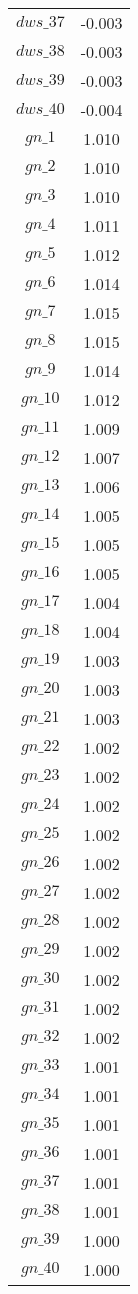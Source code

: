 \begin{center}
\begin{longtable}{cc}
$dws\_37$ 	 & 	 -0.003 \\
$dws\_38$ 	 & 	 -0.003 \\
$dws\_39$ 	 & 	 -0.003 \\
$dws\_40$ 	 & 	 -0.004 \\
$gn\_1$ 	 & 	 1.010 \\
$gn\_2$ 	 & 	 1.010 \\
$gn\_3$ 	 & 	 1.010 \\
$gn\_4$ 	 & 	 1.011 \\
$gn\_5$ 	 & 	 1.012 \\
$gn\_6$ 	 & 	 1.014 \\
$gn\_7$ 	 & 	 1.015 \\
$gn\_8$ 	 & 	 1.015 \\
$gn\_9$ 	 & 	 1.014 \\
$gn\_10$ 	 & 	 1.012 \\
$gn\_11$ 	 & 	 1.009 \\
$gn\_12$ 	 & 	 1.007 \\
$gn\_13$ 	 & 	 1.006 \\
$gn\_14$ 	 & 	 1.005 \\
$gn\_15$ 	 & 	 1.005 \\
$gn\_16$ 	 & 	 1.005 \\
$gn\_17$ 	 & 	 1.004 \\
$gn\_18$ 	 & 	 1.004 \\
$gn\_19$ 	 & 	 1.003 \\
$gn\_20$ 	 & 	 1.003 \\
$gn\_21$ 	 & 	 1.003 \\
$gn\_22$ 	 & 	 1.002 \\
$gn\_23$ 	 & 	 1.002 \\
$gn\_24$ 	 & 	 1.002 \\
$gn\_25$ 	 & 	 1.002 \\
$gn\_26$ 	 & 	 1.002 \\
$gn\_27$ 	 & 	 1.002 \\
$gn\_28$ 	 & 	 1.002 \\
$gn\_29$ 	 & 	 1.002 \\
$gn\_30$ 	 & 	 1.002 \\
$gn\_31$ 	 & 	 1.002 \\
$gn\_32$ 	 & 	 1.002 \\
$gn\_33$ 	 & 	 1.001 \\
$gn\_34$ 	 & 	 1.001 \\
$gn\_35$ 	 & 	 1.001 \\
$gn\_36$ 	 & 	 1.001 \\
$gn\_37$ 	 & 	 1.001 \\
$gn\_38$ 	 & 	 1.001 \\
$gn\_39$ 	 & 	 1.000 \\
$gn\_40$ 	 & 	 1.000 \\
\bottomrule%
\end{longtable}
\end{center}
